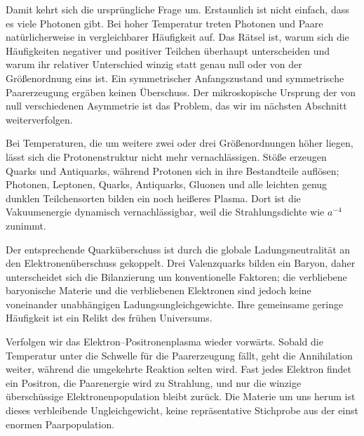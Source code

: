 Damit kehrt sich die ursprüngliche Frage um. Erstaunlich ist nicht einfach, dass es viele Photonen gibt. Bei hoher Temperatur treten Photonen und Paare natürlicherweise in vergleichbarer Häufigkeit auf. Das Rätsel ist, warum sich die Häufigkeiten negativer und positiver Teilchen überhaupt unterscheiden und warum ihr relativer Unterschied winzig statt genau null oder von der Größenordnung eins ist. Ein symmetrischer Anfangszustand und symmetrische Paarerzeugung ergäben keinen Überschuss. Der mikroskopische Ursprung der von null verschiedenen Asymmetrie ist das Problem, das wir im nächsten Abschnitt weiterverfolgen.

Bei Temperaturen, die um weitere zwei oder drei Größenordnungen höher liegen, lässt sich die Protonenstruktur nicht mehr vernachlässigen. Stöße erzeugen Quarks und Antiquarks, während Protonen sich in ihre Bestandteile auflösen; Photonen, Leptonen, Quarks, Antiquarks, Gluonen und alle leichten genug dunklen Teilchensorten bilden ein noch heißeres Plasma. Dort ist die Vakuumenergie dynamisch vernachlässigbar, weil die Strahlungsdichte wie \(a^{-4}\) zunimmt.

Der entsprechende Quarküberschuss ist durch die globale Ladungsneutralität an den Elektronenüberschuss gekoppelt. Drei Valenzquarks bilden ein Baryon, daher unterscheidet sich die Bilanzierung um konventionelle Faktoren; die verbliebene baryonische Materie und die verbliebenen Elektronen sind jedoch keine voneinander unabhängigen Ladungsungleichgewichte. Ihre gemeinsame geringe Häufigkeit ist ein Relikt des frühen Universums.

Verfolgen wir das Elektron--Positronenplasma wieder vorwärts. Sobald die Temperatur unter die Schwelle für die Paarerzeugung fällt, geht die Annihilation weiter, während die umgekehrte Reaktion selten wird. Fast jedes Elektron findet ein Positron, die Paarenergie wird zu Strahlung, und nur die winzige überschüssige Elektronenpopulation bleibt zurück. Die Materie um uns herum ist dieses verbleibende Ungleichgewicht, keine repräsentative Stichprobe aus der einst enormen Paarpopulation.

\begin{classroomqa}
\end{classroomqa}

